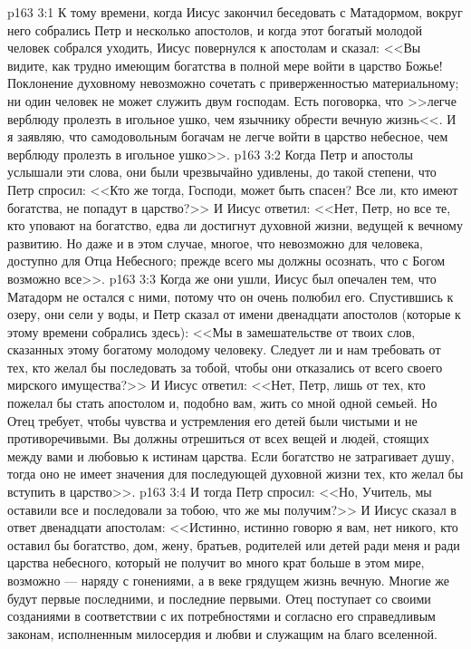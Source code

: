 \vs p163 3:1 К тому времени, когда Иисус закончил беседовать с Матадормом, вокруг него собрались Петр и несколько апостолов, и когда этот богатый молодой человек собрался уходить, Иисус повернулся к апостолам и сказал: <<Вы видите, как трудно имеющим богатства в полной мере войти в царство Божье! Поклонение духовному невозможно сочетать с приверженностью материальному; ни один человек не может служить двум господам. Есть поговорка, что >>легче верблюду пролезть в игольное ушко, чем язычнику обрести вечную жизнь<<. И я заявляю, что самодовольным богачам не легче войти в царство небесное, чем верблюду пролезть в игольное ушко>>.
\vs p163 3:2 Когда Петр и апостолы услышали эти слова, они были чрезвычайно удивлены, до такой степени, что Петр спросил: <<Кто же тогда, Господи, может быть спасен? Все ли, кто имеют богатства, не попадут в царство?>> И Иисус ответил: <<Нет, Петр, но все те, кто уповают на богатство, едва ли достигнут духовной жизни, ведущей к вечному развитию. Но даже и в этом случае, многое, что невозможно для человека, доступно для Отца Небесного; прежде всего мы должны осознать, что с Богом возможно все>>.
\vs p163 3:3 Когда же они ушли, Иисус был опечален тем, что Матадорм не остался с ними, потому что он очень полюбил его. Спустившись к озеру, они сели у воды, и Петр сказал от имени двенадцати апостолов (которые к этому времени собрались здесь): <<Мы в замешательстве от твоих слов, сказанных этому богатому молодому человеку. Следует ли и нам требовать от тех, кто желал бы последовать за тобой, чтобы они отказались от всего своего мирского имущества?>> И Иисус ответил: <<Нет, Петр, лишь от тех, кто пожелал бы стать апостолом и, подобно вам, жить со мной одной семьей. Но Отец требует, чтобы чувства и устремления его детей были чистыми и не противоречивыми. Вы должны отрешиться от всех вещей и людей, стоящих между вами и любовью к истинам царства. Если богатство не затрагивает душу, тогда оно не имеет значения для последующей духовной жизни тех, кто желал бы вступить в царство>>.
\vs p163 3:4 И тогда Петр спросил: <<Но, Учитель, мы оставили все и последовали за тобою, что же мы получим?>> И Иисус сказал в ответ двенадцати апостолам: <<Истинно, истинно говорю я вам, нет никого, кто оставил бы богатство, дом, жену, братьев, родителей или детей ради меня и ради царства небесного, который не получит во много крат больше в этом мире, возможно --- наряду с гонениями, а в веке грядущем жизнь вечную. Многие же будут первые последними, и последние первыми. Отец поступает со своими созданиями в соответствии с их потребностями и согласно его справедливым законам, исполненным милосердия и любви и служащим на благо вселенной.

